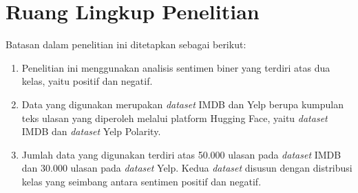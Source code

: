 \section{Ruang Lingkup Penelitian}

Batasan dalam penelitian ini ditetapkan sebagai berikut:

\begin{enumerate}
    \item Penelitian ini menggunakan analisis sentimen biner yang terdiri atas
    dua kelas, yaitu positif dan negatif.

    \item Data yang digunakan merupakan \textit{dataset} IMDB dan Yelp berupa
    kumpulan teks ulasan yang diperoleh melalui platform Hugging Face, yaitu
    \textit{dataset} IMDB dan \textit{dataset} Yelp Polarity.

    \item Jumlah data yang digunakan terdiri atas 50.000 ulasan pada
    \textit{dataset} IMDB dan 30.000 ulasan pada \textit{dataset} Yelp.
    Kedua \textit{dataset} disusun dengan distribusi kelas yang seimbang
    antara sentimen positif dan negatif.
\end{enumerate}